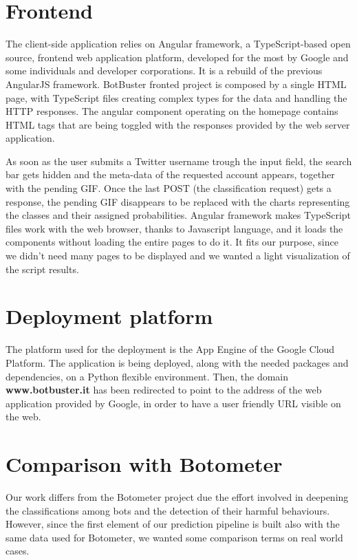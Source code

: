 \section{Frontend}
The client-side application relies on Angular framework, a TypeScript-based open source, frontend web application platform, developed for the most by Google and some individuals and developer corporations.
It is a rebuild of the previous AngularJS framework.
BotBuster fronted project is composed by a single HTML page, with TypeScript files creating complex types for the data and handling the HTTP responses.
The angular component operating on the homepage contains HTML tags that are being toggled with the responses provided by the web server application.

As soon as the user submits a Twitter username trough the input field, the search bar gets hidden and the meta-data of the requested account appears, together with the pending GIF. Once the last POST (the classification request) gets a response, the pending GIF disappears to be replaced with the charts representing the classes and their assigned probabilities. 
Angular framework makes TypeScript files work with the web browser, thanks to Javascript language, and it loads the components without loading the entire pages to do it. It fits our purpose, since we didn't need many pages to be displayed and we wanted a light visualization of the script results.

\section{Deployment platform}
The platform used for the deployment is the App Engine of the Google Cloud Platform.
The application is being deployed, along with the needed packages and dependencies, on a Python flexible environment.
Then, the domain \textbf{www.botbuster.it} has been redirected to point to the address of the web application provided by Google, in order to have a user friendly URL visible on the web.
\section{Comparison with Botometer}
Our work differs from the Botometer project due the effort involved in deepening the classifications among bots and the detection of their harmful behaviours.
However, since the first element of our prediction pipeline is built also with the same data used for Botometer, we wanted some comparison terms on real world cases.

